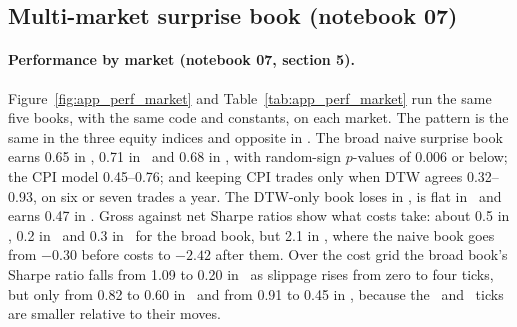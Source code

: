\FloatBarrier
\subsection{Multi-market surprise book (notebook 07)}

\paragraph{Performance by market (notebook 07, section 5).} Figure~\ref{fig:app_perf_market} and
Table~\ref{tab:app_perf_market} run the same five books, with the same code and constants, on each
market. The pattern is the same in the three equity indices and opposite in \ZN. The broad naive
surprise book earns 0.65 in \ES, 0.71 in \NQ\ and 0.68 in \YM, with random-sign $p$-values of 0.006 or
below; the CPI model 0.45--0.76; and keeping CPI trades only when DTW agrees 0.32--0.93, on six or
seven trades a year. The DTW-only book loses in \ES, is flat in \NQ\ and earns 0.47 in \YM. Gross
against net Sharpe ratios show what costs take: about 0.5 in \ES, 0.2 in \NQ\ and 0.3 in \YM\ for the
broad book, but 2.1 in \ZN, where the naive book goes from $-0.30$ before costs to $-2.42$ after them. Over the
cost grid the broad book's Sharpe ratio falls from 1.09 to 0.20 in \ES\ as slippage rises from zero
to four ticks, but only from 0.82 to 0.60 in \NQ\ and from 0.91 to 0.45 in \YM, because the \NQ\ and
\YM\ ticks are smaller relative to their moves.

